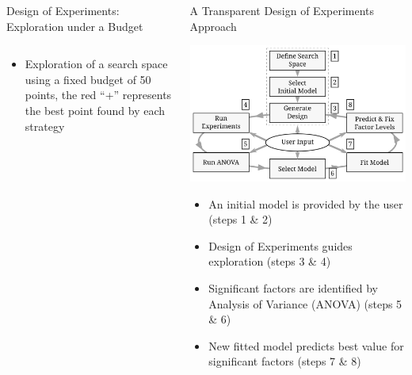 \documentclass[11pt, compress, aspectratio=169, xcolor={table,usenames,dvipsnames}]{beamer}
\begin{document}
\begin{frame}
\begin{columns}
\begin{column}{0.89\columnwidth}
\begin{columns}
\begin{column}[t]{0.48\columnwidth}
\begin{block}{Design of Experiments: Exploration under a Budget}
\begin{columns}
\begin{column}{0.59\columnwidth}
\begin{itemize}
\item Exploration of a search space using a \alert{fixed budget}
of \alert{50 points}, the \alert{red “+”} represents the best point found by
each strategy
\end{itemize}
\end{column}
\end{columns}
\end{block}
\end{column}
\begin{column}[t]{0.48\columnwidth}
\begin{block}{A Transparent Design of Experiments Approach}
\begin{center}
\includegraphics[width=0.8\columnwidth]{../../../img/doe_anova_strategy.pdf}
\end{center}

\vspace{1em}

\begin{itemize}
\item An \alert{initial model} is provided by the \alert{user} (steps \alert{1} \& \alert{2})
\item \alert{Design of Experiments} guides exploration (steps \alert{3} \& \alert{4})
\item \alert{Significant factors} are identified by \alert{Analysis of Variance (ANOVA)} (steps \alert{5} \& \alert{6})
\item New fitted model predicts best value for significant factors (steps \alert{7} \& \alert{8})
\end{itemize}


\end{block}
\end{column}
\end{columns}
\end{column}
\end{columns}
\end{frame}
\end{document}
